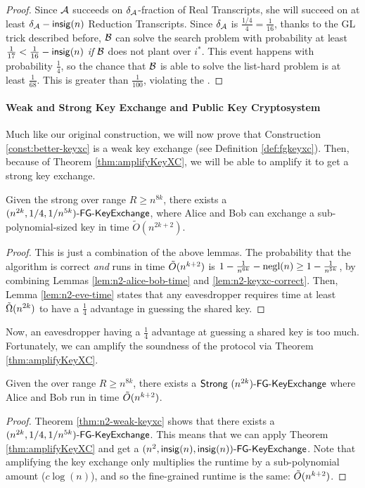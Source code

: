 \begin{proof}
	Since $\cA$ succeeds on $\delta_{\cA}$-fraction of Real Transcripts, she will succeed on at least $\delta_{\cA} - \insig(n)$ Reduction Transcripts. Since $\delta_{\cA}$ is $\frac{1/4}{4} = \frac{1}{16}$, thanks to the GL trick described before, $\cB$ can solve the search problem with probability at least $\frac{1}{17} < \frac{1}{16} - \insig(n)$ \emph{if} $\cB$ does not plant over $i^*$. This event happens with probability $\frac{1}{4}$, so the chance that $\cB$ is able to solve the list-hard problem is at least $\frac{1}{68}$.
	This is greater than $\frac{1}{100}$, violating the \strongzkc.
\end{proof}

\paragraph{Weak and Strong Key Exchange and Public Key Cryptosystem}
Much like our original construction, we will now prove that Construction \ref{const:better-keyxc} is a weak key exchange (see Definition \ref{def:fgkeyxc}). Then, because of Theorem \ref{thm:amplifyKeyXC}, we will be able to amplify it to get a strong key exchange.

\begin{theorem}\label{thm:n2-weak-keyxc}
	Given the strong \zkclique over range $R \ge n^{8k}$, there exists a
	$\fgkeyxc{n^{2k}}{1/4}{1/n^{5k}}$, where Alice and Bob can exchange a sub-polynomial-sized key in time $\tilde{O}\left(n^{2k + 2}\right)$.
\end{theorem}
\begin{proof}
	This is just a combination of the above lemmas. The probability that the algorithm is correct \emph{and} runs in time $\~O(n^{k+2})$ is $1 - \frac{1}{n^{6k}} - \negl(n) \ge 1 - \frac{1}{n^{5k}}$, by combining Lemmas \ref{lem:n2-alice-bob-time} and \ref{lem:n2-keyxc-correct}. Then, Lemma \ref{lem:n2-eve-time} states that any eavesdropper requires time at least $\~\Omega(n^{2k})$ to have a $\frac 1 4$ advantage in guessing the shared key.
\end{proof}

Now, an eavesdropper having a $\frac 1 4$ advantage at guessing a shared key is too much. Fortunately, we can amplify the soundness of the protocol via Theorem \ref{thm:amplifyKeyXC}.

\begin{corollary}
	Given the \strongzkc over range $R \ge n^{8k}$, there exists a
	$\strongfgkeyxc{n^{2k}}$ where Alice and Bob run in time $\~O(n^{k+2})$.
\end{corollary}
\begin{proof}
	Theorem \ref{thm:n2-weak-keyxc} shows that there exists a $\fgkeyxc{n^{2k}}{1/4}{1/n^{5k}}$. This means that we can apply Theorem \ref{thm:amplifyKeyXC} and get a $\fgkeyxc{n^2}{\insig(n)}{\insig(n)}$. Note that amplifying the key exchange only multiplies the runtime by a sub-polynomial amount ($c\log(n)$), and so the fine-grained runtime is the same: $\~O(n^{k+2})$.
\end{proof}

